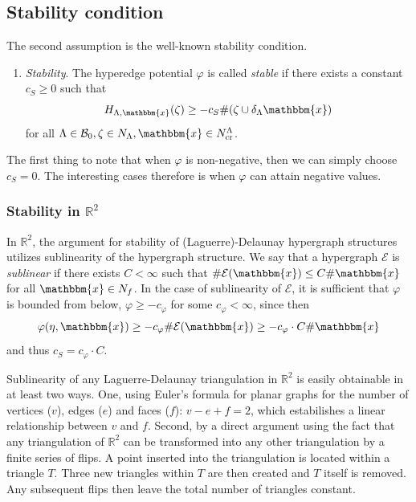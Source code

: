 \documentclass[12pt,a4paper]{article}
\theoremstyle{definition}
\theoremstyle{remark}
\theoremstyle{theorem}
\newcommand{\x}{\mathbbm{x}}
\begin{document}
\subsection{Stability condition}
The second assumption is the well-known stability condition. 
\begin{enumerate}[\textbf{(S)}] 
	\item \textit{Stability}. The hyperedge potential $\varphi$ is called \textit{stable} if there exists a constant $c_S \geq 0$ such that 
$$H_{\Lambda,\x}(\zeta) \geq -c_S \#(\zeta \cup \delta_\Lambda \x)$$
for all $\Lambda \in \mathcal B_0, \zeta \in N_\Lambda, \x \in N^\Lambda_{\text{cr}}$.
\end{enumerate}

The first thing to note that when $\varphi$ is non-negative, then we can simply choose $c_S = 0$. The interesting cases therefore is when $\varphi$ can attain negative values.\newline

\subsubsection{Stability in $\mathbb R^2$}
In $\mathbb R^2$, the argument for stability of (Laguerre)-Delaunay hypergraph structures utilizes sublinearity of the hypergraph structure. We say that a hypergraph $\mathcal E$ is \textit{sublinear} if there exists $C < \infty$ such that $\# \mathcal E(\x) \leq C \# \x$ for all $\x \in N_f$. In the case of sublinearity of $\mathcal E$, it is sufficient that $\varphi$ is bounded from below, $\varphi \geq - c_\varphi$ for some $c_\varphi < \infty$, since then 
$$\varphi(\eta,\x) \geq -c_\varphi \#\mathcal E(\x) \geq -c_\varphi\cdot C \# \x$$ 
and thus $c_S = c_\varphi \cdot C$.

Sublinearity of any Laguerre-Delaunay triangulation in $\mathbb R^2$ is easily obtainable in at least two ways. One, using Euler's formula for planar graphs for the number of vertices ($v$), edges ($e$) and faces ($f$): $v-e+f=2$, which estabilishes a linear relationship between $v$ and $f$. Second, by a direct argument using the fact that any triangulation of $\mathbb R^2$ can be transformed into any other triangulation by a finite series of flips\cite{Lawson72}. A point inserted into the triangulation is located within a triangle $T$. Three new triangles within $T$ are then created and $T$ itself is removed. Any subsequent flips then leave the total number of triangles constant.\newline
\end{document}
